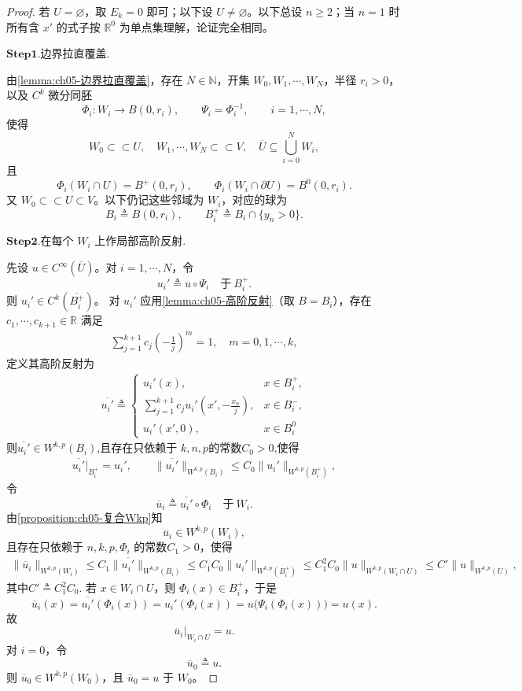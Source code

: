 \documentclass[../../main.tex]{subfiles}
\begin{document}
\begin{proof}

若 $U=\varnothing$，取 $E_k=0$ 即可；以下设 $U\neq\varnothing$。以下总设 $n\geqslant2$；当 $n=1$ 时所有含 $x'$ 的式子按 $\mathbb{R}^{0}$ 为单点集理解，论证完全相同。

\noindent$\mathbf{Step}\bm{1}$.{\heiti 边界拉直覆盖.}

由\cref{lemma:ch05-边界拉直覆盖}，存在 $N\in\mathbb{N}$，开集 $W_0,W_1,\cdots,W_N$，半径 $r_i>0$，以及 $C^{k}$ 微分同胚
\[
\Phi_i:W_i\longrightarrow B(0,r_i),
\qquad
\Psi_i=\Phi_i^{-1},
\qquad i=1,\cdots,N,
\]
使得
\[
W_0\subset\subset U,\quad W_1,\cdots,W_N\subset\subset V,\quad \overline{U}\subseteq\bigcup_{i=0}^{N}W_i,
\]
且
\[
\Phi_i(W_i\cap U)=B^{+}(0,r_i),
\qquad
\Phi_i(W_i\cap\partial U)=B^{0}(0,r_i).
\]
又 $W_0\subset\subset U\subset V$。以下仍记这些邻域为 $W_i$，对应的球为
\[
B_i\triangleq B(0,r_i),
\qquad
B_i^{+}\triangleq B_i\cap\{y_n>0\}.
\]

\noindent$\mathbf{Step}\bm{2}$.{\heiti 在每个 $W_i$ 上作局部高阶反射.}

先设 $u\in C^{\infty}(\overline{U})$。对 $i=1,\cdots,N$，令
\[
u_i'\triangleq u\circ\Psi_i
\quad\text{于}\ B_i^{+}.
\]
则 $u_i'\in C^{k}(\overline{B_i^{+}})$。
对 $u_i'$ 应用\cref{lemma:ch05-高阶反射}（取 $B=B_i$），存在 $c_1,\cdots,c_{k+1}\in\mathbb{R}$ 满足
\begin{align}
\sum_{j=1}^{k+1}c_j\left(-\frac{1}{j}\right)^{m}=1,\quad m=0,1,\cdots,k,
\label{eq:ch05-统一-矩条件}
\end{align}
定义其高阶反射为
\begin{align}
\overline{u_i'}\triangleq
\begin{cases}
u_i'(x), & x\in B_{i}^{+},\\
\displaystyle\sum_{j=1}^{k+1}c_ju_i'\left(x',-\frac{x_n}{j}\right), & x\in B_{i}^{-},\\
u_i'(x',0), & x\in B_{i}^{0}
\label{eq:ch05-统一-反射}
\end{cases}
\end{align}
则$\overline{u_i'}\in W^{k,p}(B_{i})$,且存在只依赖于 $k,n,p$的常数$C_0>0$,使得
\begin{align}
\overline{u_i'}|_{B_i^{+}}=u_i',
\qquad
\|\overline{u_i'}\|_{W^{k,p}(B_i)}
\leqslant
C_0\|u_i'\|_{W^{k,p}(B_i^{+})},
\label{eq:ch05-统一-反射估计}
\end{align}
令
\[
\overline{u}_i\triangleq\overline{u_i'}\circ\Phi_i
\quad\text{于}\ W_i.
\]
由\cref{proposition:ch05-复合Wkp}知
\[
\overline{u}_i\in W^{k,p}(W_i),
\]
且存在只依赖于 $n,k,p,\Phi_i$ 的常数$C_1>0$，使得
\begin{align}
\|\overline{u}_i\|_{W^{k,p}(W_i)}
\leqslant
C_1\|\overline{u_i'}\|_{W^{k,p}(B_i)}
\leqslant
C_1C_0\|u_i'\|_{W^{k,p}(B_i^{+})}
\leqslant
C_1^2C_0\|u\|_{W^{k,p}(W_i\cap U)}
\leqslant
C'\|u\|_{W^{k,p}(U)},\label{eqnhjNHJNJZZZ}
\end{align}
其中$C'\triangleq C_1^2C_0$.
若 $x\in W_i\cap U$，则 $\Phi_i(x)\in B_i^{+}$，于是
\[
\overline{u}_i(x)
=
\overline{u_i'}(\Phi_i(x))
=
u_i'(\Phi_i(x))
=
u\bigl(\Psi_i(\Phi_i(x))\bigr)
=
u(x).
\]
故
\[
\overline{u}_i|_{W_i\cap U}=u.
\]
对 $i=0$，令
\[
\overline{u}_0\triangleq u.
\]
则 $\overline{u}_0\in W^{k,p}(W_0)$，且 $\overline{u}_0=u$ 于 $W_0$。


\end{proof}
\end{document}
